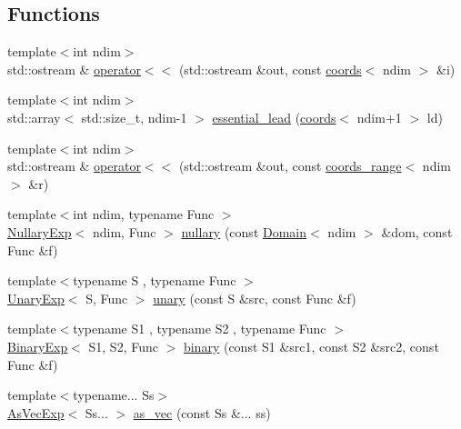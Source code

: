 \subsection*{Functions}
\begin{DoxyCompactItemize}
\item 
{\footnotesize template$<$int ndim$>$ }\\std\+::ostream \& \hyperlink{namespaceshark_1_1ndim_a2b5f024bd72953162e3cb106e9cc9940}{operator$<$$<$} (std\+::ostream \&out, const \hyperlink{structshark_1_1ndim_1_1coords}{coords}$<$ ndim $>$ \&i)
\item 
{\footnotesize template$<$int ndim$>$ }\\std\+::array$<$ std\+::size\+\_\+t, ndim-\/1 $>$ \hyperlink{namespaceshark_1_1ndim_a7f59f7bfee22f07fdfe527cc9643734c}{essential\+\_\+lead} (\hyperlink{structshark_1_1ndim_1_1coords}{coords}$<$ ndim+1 $>$ ld)
\item 
{\footnotesize template$<$int ndim$>$ }\\std\+::ostream \& \hyperlink{namespaceshark_1_1ndim_a8004c988b27d071901f9f5f465b96a72}{operator$<$$<$} (std\+::ostream \&out, const \hyperlink{structshark_1_1ndim_1_1coords__range}{coords\+\_\+range}$<$ ndim $>$ \&r)
\item 
{\footnotesize template$<$int ndim, typename Func $>$ }\\\hyperlink{classshark_1_1ndim_1_1_nullary_exp}{Nullary\+Exp}$<$ ndim, Func $>$ \hyperlink{namespaceshark_1_1ndim_ae642624dc61ac0881dbf0be36871006b}{nullary} (const \hyperlink{classshark_1_1ndim_1_1_domain}{Domain}$<$ ndim $>$ \&dom, const Func \&f)
\item 
{\footnotesize template$<$typename S , typename Func $>$ }\\\hyperlink{classshark_1_1ndim_1_1_unary_exp}{Unary\+Exp}$<$ S, Func $>$ \hyperlink{namespaceshark_1_1ndim_af14b9ab4bea37d932d735ef2902cbae7}{unary} (const S \&src, const Func \&f)
\item 
{\footnotesize template$<$typename S1 , typename S2 , typename Func $>$ }\\\hyperlink{classshark_1_1ndim_1_1_binary_exp}{Binary\+Exp}$<$ S1, S2, Func $>$ \hyperlink{namespaceshark_1_1ndim_ab41df8eae2cf48f08d7d547d24268145}{binary} (const S1 \&src1, const S2 \&src2, const Func \&f)
\item 
{\footnotesize template$<$typename... Ss$>$ }\\\hyperlink{classshark_1_1ndim_1_1_as_vec_exp}{As\+Vec\+Exp}$<$ Ss... $>$ \hyperlink{namespaceshark_1_1ndim_a154fb3be8af2f4f57ae49b73cd1a3820}{as\+\_\+vec} (const Ss \&... ss)

\end{DoxyCompactItemize}
